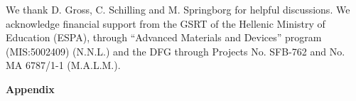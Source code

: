 \documentclass[aps,twocolumn,showpacs,pra,superscriptaddress,floatfix,longbibliography]{revtex4-1}
\newcommand{\7}{\dagger}
\newcommand{\bra}[1]{\mbox{$\langle #1 |$}}
\newcommand{\ket}[1]{\mbox{$| #1 \rangle$}}
\newcommand{\ii}{\bm{i}}
\renewcommand{\H}{\mathcal{H}}
\newtheorem{thm}{Theorem}
\begin{document}
We thank D. Gross, C. Schilling and M. Springborg for 
helpful discussions. We acknowledge financial support from 
the GSRT of the Hellenic Ministry of Education (ESPA), 
through ``Advanced Materials and Devices'' program 
(MIS:5002409) (N.N.L.) and the DFG through Projects 
No. SFB-762 and No. MA 6787/1-1 (M.A.L.M.).


\appendix 
\begin{center}
\textbf{\large Appendix}
\end{center}

\setcounter{equation}{0}
\setcounter{figure}{0}
\setcounter{table}{0}
\setcounter{section}{0}
\makeatletter

%
%
%
%
%
\end{document}
